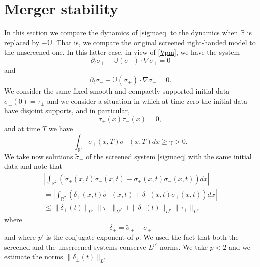 \documentclass[11pt,reqno]{amsproc}
\newcommand{\pa}{\partial}
\newcommand{\la}{\label}
\newcommand{\na}{\nabla}
\newcommand{\be}{\begin{equation}}
\newcommand{\ee}{\end{equation}}
\newcommand{\ba}{\begin{array}{l}}
\newcommand{\ea}{\end{array}}
\newcommand{\Rr}{{\mathbb R}}
\begin{document}
\section{Merger stability}\la{mergstabi}
In this section we compare the dynamics of \eqref{sigmaeq} to the dynamics when $\mathbb B$ is replaced by
$-\mathbb U$. That is, we compare the original screened right-handed model to the unscreened one. In this latter case, in view of \eqref{Vpm},  we have the system
\be
\pa_t \sigma_{+} - \mathbb U(\sigma_{-})\cdot\na \sigma_{+} = 0
\la{sigpleq}
\ee
and
\be
\pa_t \sigma_{-} + \mathbb U(\sigma_{+})\cdot\na\sigma_{-} = 0.
\la{sigmineq}
\ee
We consider the same fixed smooth and compactly supported initial data $\sigma_{\pm}(0)= \tau_{\pm} $ and we consider a situation in which at time zero the initial data have disjoint supports, and in particular,
\be
\tau_+(x)\tau_-(x)= 0,
\la{timezero}
\ee
and at time $T$ we have
\be
\int_{\Rr^2}\sigma_+(x,T)\sigma_-(x,T)dx \ge \gamma>0.
\la{timeone}
\ee
We take now solutions $\widetilde\sigma_{\pm}$ of the screened system \eqref{sigmaeq} with the same initial data and note that
\be
\ba
\left |\int_{\Rr^2} (\widetilde\sigma_+(x,t)\widetilde\sigma_-(x,t) -\sigma_+(x,t)\sigma_{-}(x,t))dx\right | \\
=\left |\int_{\Rr^2}(\delta_+(x,t)\widetilde\sigma_-(x,t) +\delta_-(x,t)\sigma_+(x,t))dx\right|\\
\le \|\delta_+(t)\|_{L^p}\|\tau_-\|_{L^{p'}} + \|\delta_-(t)\|_{L^p}\|\tau_+\|_{L^{p'}}
\ea
\la{prodb}
\ee
where
\be
\delta_{\pm} = \widetilde\sigma_{\pm} -\sigma_{\pm}
\la{deltas}
\ee
and where $p'$ is the conjugate exponent of $p$. We used the fact that both the screened and the unscreened systems conserve $L^{p'}$ norms. We take $p<2$ and we estimate the norms  $\|\delta_{\pm}(t)\|_{L^p}$.
\end{document}

